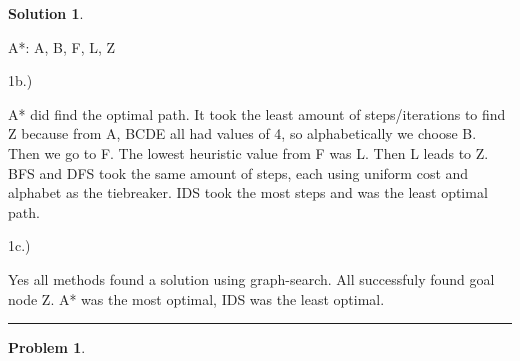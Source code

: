 \documentclass{article}
\theoremstyle{definition}
\newtheorem{problem}{Problem}
\def\fline{\rule{0.75\linewidth}{0.5pt}}
\newcommand{\finishline}{\begin{center}\fline\end{center}}
\newtheorem*{solution*}{Solution}
\newenvironment{solution}{\begin{solution*}}{{\finishline} \end{solution*}}
\begin{document}
\begin{solution}
\begin{figure}[h!]
		\end{figure}

	\begin{newpage}
	\end{newpage}

	\item A*: A, B, F, L, Z
		\begin{figure}[h!]
			\centering
		 
		\end{figure}

	\item 1b.) 
	
	\item A* did find the optimal path. It took the least amount of steps/iterations to find Z because from A, BCDE all had values of 4, so alphabetically we choose B. Then we go to F. The lowest heuristic value from F was L. Then L leads to Z. BFS and DFS took the same amount of steps, each using uniform cost and alphabet as the tiebreaker. IDS took the most steps and was the least optimal path. 

	\item 1c.) 
	\item Yes all methods found a solution using graph-search. All successfuly found goal node Z. A* was the most optimal, IDS was the least optimal. 


\end{solution}

\begin{problem} %
	
\end{problem}
\end{document}
